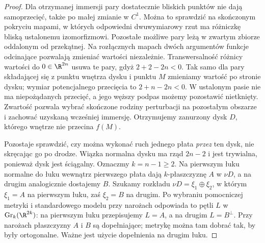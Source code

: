 \begin{proof}
Dla otrzymanej immersji pary dostatecznie bliskich
punktów nie dają samoprzecięć, także po małej zmianie
w $C^1$. Można to sprawdzić na skończonym pokryciu
mapami, w których odpowiedni dwuwymiarowy rzut ma
różniczkę bliską ustalonemu izomorfizmowi.
Pozostałe możliwe pary leżą w zwartym zbiorze
oddalonym od przekątnej. Na rozłącznych mapach
dwóch argumentów funkcje odcinające pozwalają
zmieniać wartości niezależnie. Transwersalność
różnicy wartości do $0\in\R^{2n}$ usuwa te pary,
gdyż $2+2-2n<0$. Tak samo dla pary składającej się
z punktu wnętrza dysku i punktu $M$ zmieniamy
wartość po stronie dysku; wymiar potencjalnego
przecięcia to $2+n-2n<0$. W ustalonym pasie nie
ma niepożądanych przecięć, a jego węższy podpas
możemy pozostawić nietknięty. Zwartość pozwala
wybrać skończone rodziny perturbacji na pozostałym
obszarze i zachować uzyskaną wcześniej immersję.
Otrzymujemy zanurzony dysk $D$, którego wnętrze
nie przecina $f(M)$.

Pozostaje sprawdzić, czy można wykonać
ruch jednego płata \emph{przez} ten dysk,
nie skręcając go po drodze. Wiązka
normalna dysku ma rząd $2n-2$ i jest
trywialna, ponieważ dysk jest ściągalny.
Oznaczmy $k=n-1\geq2$. Na pierwszym łuku normalne
do łuku wewnątrz pierwszego płata dają $k$-płaszczyznę
$A$ w $\nu D$, a na drugim analogicznie dostajemy $B$.
Szukamy rozkładu $\nu D=\xi_1\oplus\xi_2$, w którym
$\xi_1=A$ na pierwszym łuku, zaś $\xi_2=B$ na drugim.
Po wybraniu pomocniczej metryki i standardowego modelu
przy narożach odpowiada to pętli $L$ w
$\operatorname{Gr}_k(\R^{2k})$: na pierwszym łuku
przepisujemy $L=A$, a na drugim $L=B^\perp$.
Przy narożach płaszczyzny $A$ i $B$ są dopełniające;
metrykę można tam dobrać tak, by były ortogonalne.
Ważne jest użycie dopełnienia na drugim łuku.


\end{proof}
